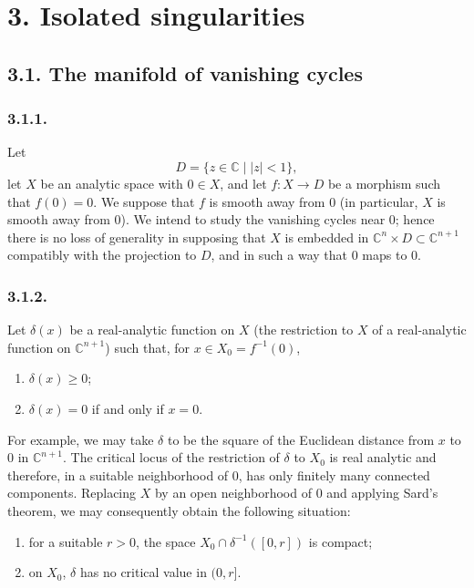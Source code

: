 \section*{3. Isolated singularities}

\subsection*{3.1. The manifold of vanishing cycles}

\subsubsection*{3.1.1.}
Let
\[
D=\{z\in\mathbb C\mid |z|<1\},
\]
let $X$ be an analytic space with $0\in X$, and let
$f:X\to D$ be a morphism such that $f(0)=0$.  We suppose that $f$ is
smooth away from $0$ (in particular, $X$ is smooth away from $0$).
We intend to study the vanishing cycles near $0$; hence there is no
loss of generality in supposing that $X$ is embedded in
$\mathbb C^n\times D\subset\mathbb C^{n+1}$ compatibly with the
projection to $D$, and in such a way that $0$ maps to $0$.

\subsubsection*{3.1.2.}
Let $\delta(x)$ be a real-analytic function on $X$ (the restriction to
$X$ of a real-analytic function on $\mathbb C^{n+1}$) such that, for
$x\in X_0=f^{-1}(0)$,

\begin{enumerate}[label=(\alph*)]
\item $\delta(x)\geq 0$;
\item $\delta(x)=0$ if and only if $x=0$.
\end{enumerate}

For example, we may take $\delta$ to be the square of the Euclidean
distance from $x$ to $0$ in $\mathbb C^{n+1}$.  The critical locus of
the restriction of $\delta$ to $X_0$ is real analytic and therefore,
in a suitable neighborhood of $0$, has only finitely many connected
components.  Replacing $X$ by an open neighborhood of $0$ and applying
Sard's theorem, we may consequently obtain the following situation:

\begin{enumerate}[label=(\alph*),start=3]
\item for a suitable $r>0$, the space
  $X_0\cap\delta^{-1}([0,r])$ is compact;
\item on $X_0$, $\delta$ has no critical value in $(0,r]$.
\end{enumerate}

